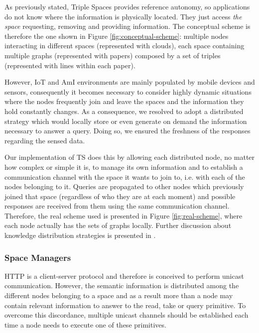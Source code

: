 
As previously stated, Triple Spaces provides reference autonomy, so applications do not know where the information is
physically located. They just access \emph{the space} requesting, removing and providing information. The conceptual
scheme is therefore the one shown in Figure \ref{fig:conceptual-scheme}: multiple nodes interacting in different spaces
(represented with clouds), each space containing multiple graphs (represented with papers) composed by a set of triples
(represented with lines within each paper).




However, IoT and AmI environments are mainly populated by mobile devices and sensors, consequently it becomes necessary
to consider highly dynamic situations where the nodes frequently join and leave the spaces and the information they hold
constantly changes. As a consequence, we resolved to adopt a distributed strategy which would locally store or even
generate on demand the information necessary to answer a query. Doing so, we ensured the freshness of the responses
regarding the sensed data.

Our implementation of TS does this by allowing each distributed node, no matter how complex or simple it is, to manage
its own information and to establish a communication channel with the space it wants to join to, i.e. with each of the
nodes belonging to it. Queries are propagated to other nodes which previously joined that space (regardless of who they
are at each moment) and possible responses are received from them using the same communication channel. Therefore, the
real scheme used is presented in Figure \ref{fig:real-scheme}, where each node actually has the sets of graphs locally.
Further discussion about knowledge distribution strategies is presented in \cite{gomezgoiri2012assessing}.

\subsubsection{Space Managers}

HTTP is a client-server protocol and therefore is conceived to perform unicast communication. However, the semantic
information is distributed among the different nodes belonging to a space and as a result more than a node may contain
relevant information to answer to the read, take or query primitive. To overcome this discordance, multiple unicast
channels should be established each time a node needs to execute one of these primitives.

